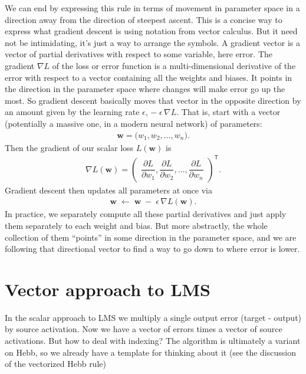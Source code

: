 We can end by expressing this rule in terms of movement in parameter space in a direction away from the direction of steepest ascent.  This is a concise way to express what gradient descent is using notation from vector calculus. But it need not be intimidating, it's just a way to arrange the symbols. A gradient vector is  a vector of partial derivatives with respect to some variable, here error.  The gradient $\nabla L$ of the loss or error function is a multi-dimensional derivative of the error with respect to a vector containing all the weights and biases. It points in the direction in the parameter space where changes will make error go up the most.  So gradient descent basically moves that vector in the opposite direction by an amount given by the learning rate $\epsilon$,  $-\;\epsilon\,\nabla L$. That is, start with a vector (potentially a massive one, in a modern neural network) of parameters:
\begin{eqnarray*}
  \mathbf{w} = \bigl(w_1, w_2, \dots, w_n\bigr).
\end{eqnarray*}
Then the gradient of our scalar loss \(L(\mathbf{w})\) is
\begin{eqnarray*}
  \nabla L(\mathbf{w})
    = \begin{pmatrix}
        \dfrac{\partial L}{\partial w_1}, 
        \dfrac{\partial L}{\partial w_2}, 
        \dots, 
        \dfrac{\partial L}{\partial w_n}
      \end{pmatrix}^\mathsf{T}.
\end{eqnarray*}
Gradient descent then updates all parameters at once via
\begin{eqnarray*}
  \mathbf{w} \;\leftarrow\; \mathbf{w} \;-\;\epsilon\,\nabla L(\mathbf{w}).
\end{eqnarray*}
In practice, we separately compute all these partial derivatives and just apply them separately to each weight and bias. But more abstractly, the whole collection of them ``points'' in some direction in the parameter space, and we are following that directional vector to find a way to go down to where error is lower.

\section{Vector approach to LMS}

In the scalar approach to LMS we multiply a single output error (target - output) by source activation. Now we have a vector of errors times a vector of source activations. But how to deal with indexing?  The algorithm is ultimately a variant on Hebb, so we already have a template for thinking about it (see the discussion of the vectorized Hebb rule)

